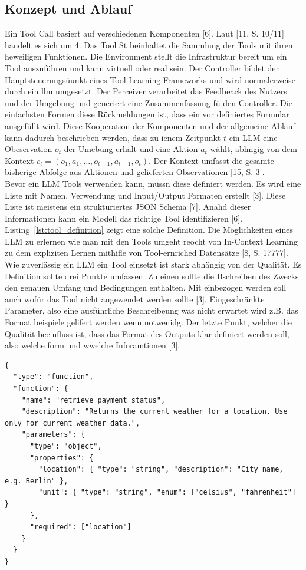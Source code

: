 \subsection{Konzept und Ablauf}

Ein Tool Call basiert auf verschiedenen Komponenten [6]. Laut [11, S. 10/11] handelt es sich um 4. Das Tool St beinhaltet die Sammlung der Tools mit ihren heweiligen 
Funktionen. Die Environment stellt die Infrastruktur bereit um ein Tool auszuführen und kann virtuell oder real sein. Der Controller bildet den Hauptsteuerungsüunkt
eines Tool Learning Frameworks und wird normalerweise durch ein llm umgesetzt. Der Perceiver verarbeitet das Feedbeack des Nutzers und der Umgebung und generiert
eine Zusammenfassung fü den Controller. Die einfachsten Formen diese Rückmeldungen ist, dass ein vor definiertes Formular ausgefüllt wird. Diese Kooperation der 
Komponenten und der allgemeine Ablauf kann dadurch beschrieben werden, dass zu ienem Zeitpunkt $t$ ein LLM eine Obeservation $o_t$ der Umebung erhält und eine Aktion
$a_t$ wählt, abhngig von dem Kontext $c_t = (o_1, a_1, \dots, o_{t-1}, a_{t-1}, o_t)$. Der Kontext umfasst die gesamte bisherige Abfolge aus Aktionen und gelieferten Observationen [15, S. 3]. \\
Bevor ein LLM Tools verwenden kann, müssn diese definiert werden. Es wird eine Liste mit Namen, Verwendung und Input/Output Formaten erstellt [3]. Diese Liste
ist meistens ein strukturiertes JSON Schema [7]. Anahd dieser Informationen kann ein Modell das richtige Tool identifizieren [6]. Listing~\ref{lst:tool_definition}
zeigt eine solche Definition. Die Möglichkeiten eines LLM zu erlernen wie man mit den Tools umgeht reocht von In-Context Learning zu dem expliziten Lernen 
mithifle von Tool-ernriched Datensätze [8, S. 17777]. \\
Wie zuverlässig ein LLM ein Tool einsetzt ist stark abhängig von der Qualität. Es Definition sollte drei Punkte umfassen. Zu einen sollte die Bschreiben des Zwecks 
den genauen Umfang und Bedingungen enthalten. Mit einbezogen werden soll auch wofür das Tool nicht angewendet werden sollte [3]. Eingeschränkte Parameter, also 
eine ausführliche Beschreibeung was nicht erwartet wird z.B. das Format beispiele gelifert werden wenn notwenidg. Der letzte Punkt, welcher die Qualität 
beeinfluss ist, dass das Format des Outputs klar definiert werden soll, also welche form und wwelche Inforamtionen [3]. 

\begin{lstlisting}[caption={Beispiel einer Tool-Definition als JSON-Schema (in Anlehnung an~\cite{tc1})}, label={lst:tool_definition}]
{
  "type": "function",
  "function": {
    "name": "retrieve_payment_status",
    "description": "Returns the current weather for a location. Use only for current weather data.",
    "parameters": {
      "type": "object",
      "properties": {
        "location": { "type": "string", "description": "City name, e.g. Berlin" },
        "unit": { "type": "string", "enum": ["celsius", "fahrenheit"] }
      },
      "required": ["location"]
    }
  }
}
\end{lstlisting}


